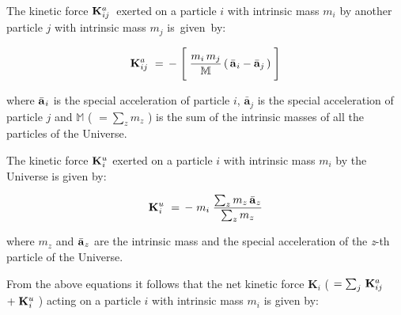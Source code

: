 \documentclass[10pt,fleqn]{article}
\begin{document}
\bigskip \smallskip

\noindent The kinetic force \hbox {$\mathbf{K}^{a}_{\hspace{+0.012em}ij}$ exerted} on a particle $i$ with intrinsic mass $m_i$ by another particle $j$ with intrinsic mass $m_j$ \hbox {is given by}:
\par \vspace{-0.54em}
\begin{eqnarray*}
\mathbf{K}^{a}_{\hspace{+0.012em}ij} ~=\, - \; \Bigg [ \; \dfrac{m_i \, m_j}{\mathbb{M}} \, ( \, \bar{\mathbf{a}}_{\hspace{+0.045em}i} - \bar{\mathbf{a}}_{j} \, ) \; \Bigg ]
\end{eqnarray*}
\par \vspace{+0.60em}
\noindent where $\bar{\mathbf{a}}_{\hspace{+0.045em}i}$ is the special acceleration of particle $i$, $\bar{\mathbf{a}}_{j}$ is the special acceleration of particle $j$ and $\mathbb{M}$ {\small ( $ = \sum_z m_z$ )} is the sum of the intrinsic masses of all the particles of the Universe.
\par \vspace{+0.60em}
\noindent The kinetic force $\mathbf{K}^{u}_{\hspace{+0.030em}i}$ exerted on a particle $i$ with intrinsic mass $m_i$ by the Universe is given by:
\par \vspace{-0.45em}
\begin{eqnarray*}
\mathbf{K}^{u}_{\hspace{+0.030em}i} ~=\, - \; m_i \; \dfrac{\sum_z m_z \, \bar{\mathbf{a}}_{\hspace{+0.045em}z}}{\sum_z m_z}
\end{eqnarray*}
\par \vspace{+0.60em}
\noindent where $m_z$ and $\bar{\mathbf{a}}_{\hspace{+0.045em}z}$ are the intrinsic mass and the special acceleration of the \textit{z}-th particle of the Universe.
\par \vspace{+0.60em}
\noindent From the above equations it follows that the net kinetic force $\mathbf{K}_i$ {\small ( $ = \sum_j \, \mathbf{K}^{a}_{\hspace{+0.012em}ij}$ $+ \; \mathbf{K}^{u}_{\hspace{+0.030em}i}$ )} acting on a particle $i$ with intrinsic mass $m_i$ is given by:
\end{document}
